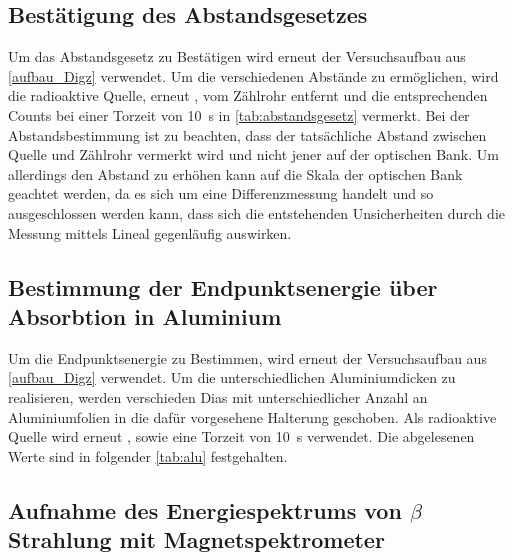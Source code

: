 \documentclass[12pt,english,ngerman]{scrartcl}
\begin{document}


\subsection{Bestätigung des Abstandsgesetzes}

Um das Abstandsgesetz zu Bestätigen wird erneut der Versuchsaufbau aus \autoref{aufbau_Digz} verwendet. Um die verschiedenen 
Abstände zu ermöglichen, wird die radioaktive Quelle, erneut , vom Zählrohr entfernt und die entsprechenden Counts bei
einer Torzeit von \SI{10}{\second} in \autoref{tab:abstandsgesetz} vermerkt. Bei der Abstandsbestimmung ist zu beachten,
dass der tatsächliche Abstand zwischen Quelle und Zählrohr vermerkt wird und nicht jener auf der optischen Bank. Um allerdings
den Abstand zu erhöhen kann auf die Skala der optischen Bank geachtet werden, da es sich um eine Differenzmessung handelt 
und so ausgeschlossen werden kann, dass sich die entstehenden Unsicherheiten durch die Messung mittels Lineal gegenläufig auswirken.



\subsection{Bestimmung der Endpunktsenergie über Absorbtion in Aluminium}

Um die Endpunktsenergie zu Bestimmen, wird erneut der Versuchsaufbau aus \autoref{aufbau_Digz} verwendet. Um die unterschiedlichen
Aluminiumdicken zu realisieren, werden verschieden Dias mit unterschiedlicher Anzahl an Aluminiumfolien in die dafür vorgesehene
Halterung geschoben. Als radioaktive Quelle wird erneut , sowie eine Torzeit von \SI{10}{\second} verwendet. Die abgelesenen 
Werte sind in folgender \autoref{tab:alu} festgehalten.


\subsection{Aufnahme des Energiespektrums von \texorpdfstring{$\beta$}{beta} Strahlung mit Magnetspektrometer}
\end{document}
